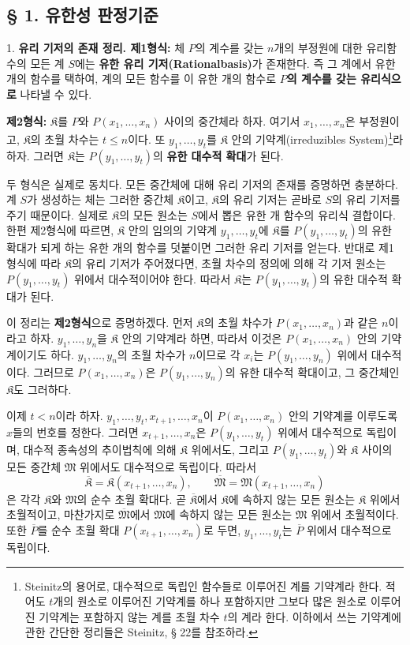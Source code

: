 \documentclass[11pt]{article}
\begin{document}
\subsection*{§ 1. 유한성 판정기준}

1. \textbf{유리 기저의 존재 정리. 제1형식:} 체 $P$의 계수를 갖는 $n$개의 부정원에 대한 유리함수의 모든 계 $S$에는 \textbf{유한 유리 기저(Rationalbasis)}가 존재한다. 즉 그 계에서 유한 개의 함수를 택하여, 계의 모든 함수를 이 유한 개의 함수로 \textbf{$P$의 계수를 갖는 유리식으로} 나타낼 수 있다.

\textbf{제2형식:} $\mathfrak K$를 $P$와 $P(x_1,\ldots,x_n)$ 사이의 중간체라 하자. 여기서 $x_1,\ldots,x_n$은 부정원이고, $\mathfrak K$의 초월 차수는 $t\leq n$이다. 또 $y_1,\ldots,y_t$를 $\mathfrak K$ 안의 기약계(irreduzibles System)\footnote{Steinitz의 용어로, 대수적으로 독립인 함수들로 이루어진 계를 기약계라 한다. 적어도 $t$개의 원소로 이루어진 기약계를 하나 포함하지만 그보다 많은 원소로 이루어진 기약계는 포함하지 않는 계를 초월 차수 $t$의 계라 한다. 이하에서 쓰는 기약계에 관한 간단한 정리들은 Steinitz, § 22를 참조하라.}라 하자. 그러면 $\mathfrak K$는 $P(y_1,\ldots,y_t)$의 \textbf{유한 대수적 확대}가 된다.

두 형식은 실제로 동치다. 모든 중간체에 대해 유리 기저의 존재를 증명하면 충분하다. 계 $S$가 생성하는 체는 그러한 중간체 $\mathfrak K$이고, $\mathfrak K$의 유리 기저는 곧바로 $S$의 유리 기저를 주기 때문이다. 실제로 $\mathfrak K$의 모든 원소는 $S$에서 뽑은 유한 개 함수의 유리식 결합이다. 한편 제2형식에 따르면, $\mathfrak K$ 안의 임의의 기약계 $y_1,\ldots,y_t$에 $\mathfrak K$를 $P(y_1,\ldots,y_t)$의 유한 확대가 되게 하는 유한 개의 함수를 덧붙이면 그러한 유리 기저를 얻는다. 반대로 제1형식에 따라 $\mathfrak K$의 유리 기저가 주어졌다면, 초월 차수의 정의에 의해 각 기저 원소는 $P(y_1,\ldots,y_t)$ 위에서 대수적이어야 한다. 따라서 $\mathfrak K$는 $P(y_1,\ldots,y_t)$의 유한 대수적 확대가 된다.

이 정리는 \textbf{제2형식}으로 증명하겠다. 먼저 $\mathfrak K$의 초월 차수가 $P(x_1,\ldots,x_n)$과 같은 $n$이라고 하자. $y_1,\ldots,y_n$을 $\mathfrak K$ 안의 기약계라 하면, 따라서 이것은 $P(x_1,\ldots,x_n)$ 안의 기약계이기도 하다. $y_1,\ldots,y_n$의 초월 차수가 $n$이므로 각 $x_i$는 $P(y_1,\ldots,y_n)$ 위에서 대수적이다. 그러므로 $P(x_1,\ldots,x_n)$은 $P(y_1,\ldots,y_n)$의 유한 대수적 확대이고, 그 중간체인 $\mathfrak K$도 그러하다.

이제 $t<n$이라 하자. $y_1,\ldots,y_t,x_{t+1},\ldots,x_n$이 $P(x_1,\ldots,x_n)$ 안의 기약계를 이루도록 $x$들의 번호를 정한다. 그러면 $x_{t+1},\ldots,x_n$은 $P(y_1,\ldots,y_t)$ 위에서 대수적으로 독립이며, 대수적 종속성의 추이법칙에 의해 $\mathfrak K$ 위에서도, 그리고 $P(y_1,\ldots,y_t)$와 $\mathfrak K$ 사이의 모든 중간체 $\mathfrak M$ 위에서도 대수적으로 독립이다. 따라서
\[
\overline{\mathfrak K}=\mathfrak K(x_{t+1},\ldots,x_n),
\qquad
\overline{\mathfrak M}=\mathfrak M(x_{t+1},\ldots,x_n)
\]
은 각각 $\mathfrak K$와 $\mathfrak M$의 순수 초월 확대다. 곧 $\overline{\mathfrak K}$에서 $\mathfrak K$에 속하지 않는 모든 원소는 $\mathfrak K$ 위에서 초월적이고, 마찬가지로 $\overline{\mathfrak M}$에서 $\mathfrak M$에 속하지 않는 모든 원소는 $\mathfrak M$ 위에서 초월적이다. 또한 $\overline P$를 순수 초월 확대 $P(x_{t+1},\ldots,x_n)$로 두면, $y_1,\ldots,y_t$는 $\overline P$ 위에서 대수적으로 독립이다.
\end{document}
